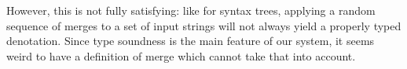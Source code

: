 \medskip

However, this is not fully satisfying: like for syntax trees, applying a random
sequence of merges to a set of input strings will not always yield a properly
typed denotation.
Since type soundness is the main feature of our system, it seems weird to have
a definition of merge which cannot take that into account.

